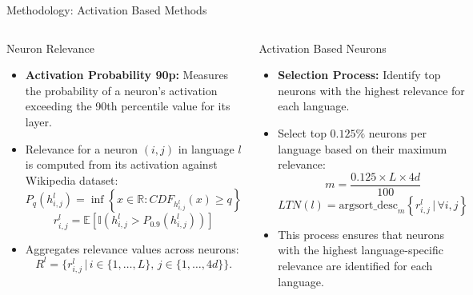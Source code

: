 \documentclass[aspectratio=169]{beamer}
\begin{document}
\begin{frame}{Methodology: Activation Based Methods}
	\begin{columns}
		\begin{block}{\scriptsize Neuron Relevance}\scriptsize
			\begin{itemize}
				\item \textbf{Activation Probability 90p:} Measures the probability of a neuron's activation exceeding the 90th percentile value for its layer.
				\item Relevance for a neuron \((i, j)\) in language \(l\) is computed from its activation against Wikipedia dataset:
				\begin{equation}
					P_q(h_{i,j}^l) = \inf \left\{x \in \mathbb{R} : CDF_{h_{i,j}^l}(x) \geq q \right\}
				\end{equation}
				\begin{equation}
					r_{i,j}^l = \mathbb{E}\left[\mathbb{I}\left(h_{i,j}^l > P_{0.9}(h_{i,j}^l)\right)\right]
				\end{equation}
				\item Aggregates relevance values across neurons:
				\begin{equation}
					R^l = \{r_{i,j}^l \, | \, i \in \{1, \dots, L\}, \, j \in \{1, \dots, 4d\}\}.
				\end{equation}
			\end{itemize}		  
		\end{block}
		\begin{block}{\scriptsize Activation Based Neurons}\scriptsize
			\begin{itemize}
				\item \textbf{Selection Process:} Identify top neurons with the highest relevance for each language.
				\item Select top $0.125\%$ neurons per language based on their maximum relevance:
				\begin{equation}
					 m = \frac{0.125 \times L \times 4d}{100}
				\end{equation}
				\begin{equation}
					LTN(l) = \text{argsort\_desc}_m \left\{r_{i,j}^l \, | \, \forall i, j\right\}
				\end{equation}
				\item This process ensures that neurons with the highest language-specific relevance are identified for each language.
			\end{itemize}
		\end{block}
	\end{columns}
\end{frame}
\end{document}
